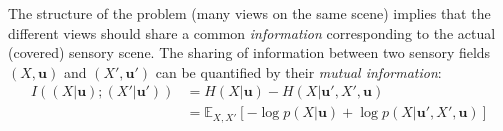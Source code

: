 \documentclass{article}
\begin{document}
The structure of the problem (many views on the same scene) implies that the different  views should share a common \emph{information} corresponding to the actual (covered) sensory scene. The sharing of information between two sensory fields $(X, \boldsymbol{u})$ and $(X', \boldsymbol{u}')$ can be quantified by their \emph{mutual information}:
\begin{align}
I((X| \boldsymbol{u}); (X'| \boldsymbol{u}')) &= H(X| \boldsymbol{u}) - H(X| \boldsymbol{u}', X', \boldsymbol{u})\\
&= \mathbb{E}_{X,X'} \left[-\log p(X| \boldsymbol{u}) + \log p(X| \boldsymbol{u}', X', \boldsymbol{u})\right] \nonumber
\end{align}
\end{document}
